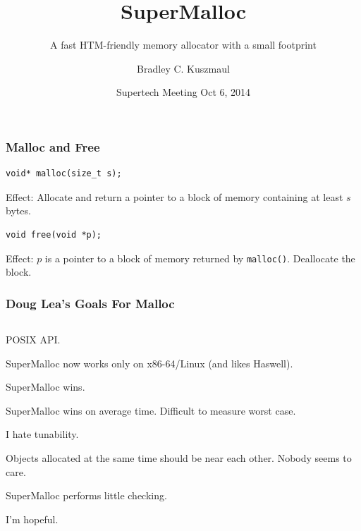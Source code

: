 \documentclass[xcolor=dvipsnames,14pt]{beamer}
\begin{document}
\title{SuperMalloc}
\subtitle{A fast HTM-friendly memory allocator with a small footprint}

\author{Bradley C. Kuszmaul}
\date{Supertech Meeting Oct 6, 2014}
\frame{\titlepage}

\begin{frame}[fragile]
\frametitle{Malloc and Free}
\begin{verbatim}
void* malloc(size_t s);
\end{verbatim}

Effect: Allocate and return a pointer to a block of memory containing at least $s$ bytes.

\begin{verbatim}
void free(void *p);
\end{verbatim}

Effect: $p$ is a pointer to a block of memory returned by \texttt{malloc()}.  Deallocate the block.
\end{frame}


\begin{frame}
\frametitle{Doug Lea's Goals For Malloc}

\begin{columns}
\hspace*{-.3cm}
\begin{column}{1.15 \textwidth}
\begin{description}
\item[Compatibility:] POSIX API.
\item[Portability:] SuperMalloc now works only on x86-64/Linux (and likes Haswell).
\item[Space:] SuperMalloc wins.
\item[Time:] SuperMalloc wins on average time.  Difficult to measure worst case.
\item[Tunability:] I hate tunability.
\item[Locality:] Objects allocated at the same time should be near each other.  Nobody seems to care.
\item[Error Detection:] SuperMalloc performs little checking.
\item[Anomalies:] I'm hopeful.
\end{description}
\end{column}
\end{columns}
\end{frame}
\end{document}
